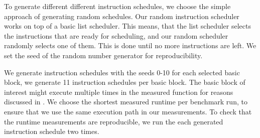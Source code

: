 To generate different different instruction schedules, we choose the simple approach of generating random schedules.
Our random instruction scheduler works on top of a basic list scheduler.
This means, that the list scheduler selects the instructions that are ready for scheduling, and our random scheduler randomly selects one of them.
This is done until no more instructions are left.
We set the seed of the random number generator for reproducibility.

We generate instruction schedules with the seeds 0-10 for each selected basic block, \ie we generate 11 instruction schedules per basic block.
The basic block of interest might execute multiple times in the measured function for reasons discussed in .
We choose the shortest measured runtime per benchmark run, to ensure that we use the same execution path in our measurements.
To check that the runtime measurements are reproducible, we run the each generated instruction schedule two times.


